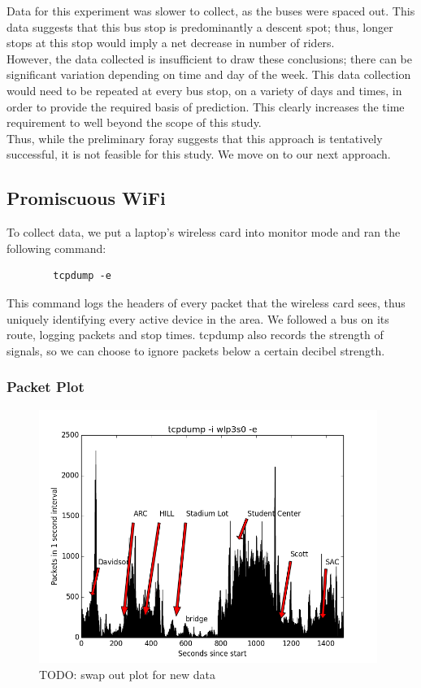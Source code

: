 \documentclass[letterpaper,abstract=on,titlepage=false]{scrreprt}
\begin{document}
	Data for this experiment was slower to collect, as the buses were spaced out.
	This data suggests that this bus stop is predominantly a descent spot; thus, longer stops at this stop would imply a net decrease in number of riders.
	\\
	However, the data collected is insufficient to draw these conclusions; there can be significant variation depending on time and day of the week.
	This data collection would need to be repeated at every bus stop, on a variety of days and times, in order to provide the required basis of prediction.
	This clearly increases the time requirement to well beyond the scope of this study.
	\\
	Thus, while the preliminary foray suggests that this approach is tentatively successful, it is not feasible for this study.
	We move on to our next approach.


\subsection*{Promiscuous WiFi}
	To collect data, we put a laptop's wireless card into monitor mode and ran the following command:
	\begin{verbatim}
		tcpdump -e
	\end{verbatim}
	This command logs the headers of every packet that the wireless card sees, thus uniquely identifying every active device in the area.
	We followed a bus on its route, logging packets and stop times.
	tcpdump also records the strength of signals, so we can choose to ignore packets below a certain decibel strength.

	\subsubsection*{Packet Plot}

		\begin{figure}[H]
		\includegraphics[width=11cm]{packets}
		\\TODO: swap out plot for new data
		\centering
		\end{figure}
\end{document}
